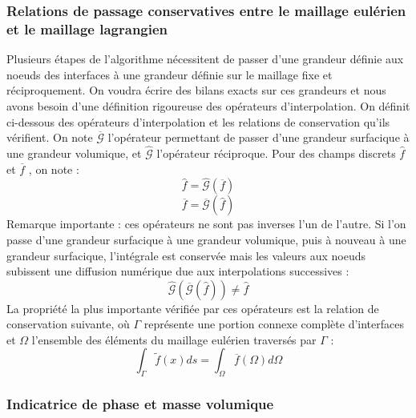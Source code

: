 \subsubsection{Relations de passage conservatives entre le maillage eul\'erien et le maillage lagrangien}
Plusieurs \'etapes de l'algorithme n\'ecessitent de passer d'une grandeur d\'efinie aux noeuds des interfaces à une grandeur d\'efinie sur le maillage fixe et r\'eciproquement.
On voudra \'ecrire des bilans exacts sur ces grandeurs et nous avons besoin d'une d\'efinition rigoureuse des op\'erateurs d'interpolation. On d\'efinit ci-dessous
des op\'erateurs d'interpolation et les relations de conservation qu'ils v\'erifient.
On note $\overline{\mathcal{G}}$ l'op\'erateur permettant de passer d'une grandeur surfacique \`a une grandeur volumique, et $\hat{\mathcal{G}}$ l'op\'erateur r\'eciproque. Pour des champs discrets $\hat{f}$ et $\overline{f}$ , on note :
\begin{equation}
\hat{f} = \hat{\mathcal{G}}(\overline{f})
\end{equation}
\begin{equation}
\overline{f} = \overline{\mathcal{G}}(\hat{f})
\end{equation}
Remarque importante : ces op\'erateurs ne sont pas inverses l'un de l'autre. Si l'on passe d'une grandeur surfacique \`a une grandeur volumique, puis \`a nouveau \`a une grandeur surfacique, l'int\'egrale est conserv\'ee mais les valeurs aux noeuds subissent une diffusion num\'erique due aux interpolations successives :
\begin{equation}
\hat{\mathcal{G}} \left( \overline{\mathcal{G}} \left( \hat{f} \right) \right) \neq  
\hat{f} 
\end{equation}
La propri\'et\'e la plus importante v\'erifi\'ee par ces op\'erateurs est la relation de conservation suivante, o\`u $\Gamma$ repr\'esente une portion connexe compl\`ete d'interfaces et $\Omega$ l'ensemble des \'el\'ements du maillage eul\'erien travers\'es par $\Gamma$ :
\begin{equation}
\int_{\Gamma} \tilde{f}(x) ds = \int_{\Omega} \overline{f}(\Omega) d\Omega
\end{equation}

\subsubsection{Indicatrice de phase et masse volumique}

